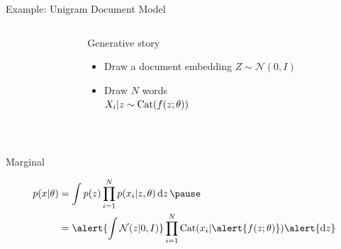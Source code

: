 \documentclass[14pt]{beamer}
\begin{document}
\begin{frame}{Example: Unigram Document Model}


\begin{columns}
	\begin{column}{0.2\textwidth}
    \end{column}
    \begin{column}{0.75\textwidth}
    	Generative story 
    	\begin{itemize}
			\item Draw a document embedding $Z \sim \mathcal N(0, I)$
			\item Draw $N$ words\\
			$X_i|z \sim \operatorname{Cat}(f(z; \theta))$
		\end{itemize}
    \end{column}
    \end{columns}
    
    
    ~
    
	Marginal \pause
	\begin{small}
    \begin{equation*}
	\begin{aligned}						
		p(x|\theta) &= \int p(z) \prod_{i=1}^N p(x_i|z, \theta) \dd{z} \pause \\
		&= \alert{\int \mathcal N(z|0, I)} \prod_{i=1}^N \Cat(x_i|\alert{f(z; \theta)}) \alert{\dd{z}}
	\end{aligned}
	\end{equation*}
	\end{small}

\end{frame}
\end{document}
